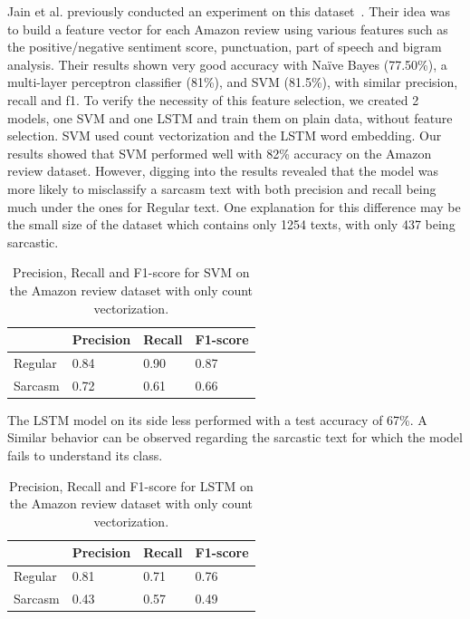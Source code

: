 \documentclass[10pt,twocolumn,letterpaper]{article}
\begin{document}
Jain et al. previously conducted an experiment on this dataset~\cite{jain2019}.
Their idea was to build a feature vector for each Amazon review using various features such as the positive/negative sentiment score, punctuation, part of speech and bigram analysis.
Their results shown very good accuracy with Naïve Bayes (77.50\%), a multi-layer perceptron classifier (81\%), and SVM (81.5\%), with similar precision, recall and f1.
To verify the necessity of this feature selection, we created 2 models, one SVM and one LSTM and train them on plain data, without feature selection.
SVM used count vectorization and the LSTM word embedding.
Our results showed that SVM performed well with 82\% accuracy on the Amazon review dataset.
However, digging into the results revealed that the model was more likely to misclassify a sarcasm text with both precision and recall being much under the ones for Regular text.
One explanation for this difference may be the small size of the dataset which contains only 1254 texts, with only 437 being sarcastic.

\begin{table}[H]
    \centering
    \begin{tabularx}{\linewidth}{|X|X|X|X|}
        \hline
        & Precision & Recall & F1-score \\
        \hline
        Regular & 0.84 & 0.90 & 0.87 \\
        \hline
        Sarcasm & 0.72 & 0.61 & 0.66 \\
        \hline
    \end{tabularx}
    \caption{Precision, Recall and F1-score for SVM on the Amazon review dataset with only count vectorization.}
\end{table}

The LSTM model on its side less performed with a test accuracy of 67\%.
A Similar behavior can be observed regarding the sarcastic text for which the model fails to understand its class.

\begin{table}[H]
    \centering
    \begin{tabularx}{\linewidth}{|X|X|X|X|}
        \hline
        & Precision & Recall & F1-score \\
        \hline
        Regular & 0.81 & 0.71 & 0.76 \\
        \hline
        Sarcasm & 0.43 & 0.57 & 0.49 \\
        \hline
    \end{tabularx}
    \caption{Precision, Recall and F1-score for LSTM on the Amazon review dataset with only count vectorization.}
\end{table}
\end{document}
